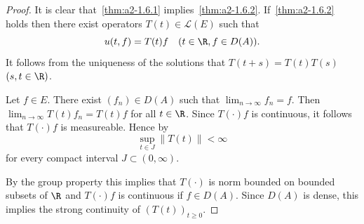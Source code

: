 \begin{proof}
It is clear that~\ref{thm:a2-1.6.1} implies~\ref{thm:a2-1.6.2}. 
If~\ref{thm:a2-1.6.2}   holds then there exist operators $T(t) \in \mathcal{L}(E)$ such that 
%
\[
	u(t,f) = T(t)f \quad (t \in \R, f \in D(A)) .
\]
%
It follows from the uniqueness of the solutions that $T(t+s) = T(t)T(s)$ $(s,t \in \R)$.

Let $f \in E$. 
There exist $(f_{n}) \in D(A)$ such that $\lim_{n \to \infty} f_{n} = f$.
Then $\lim_{n \to \infty} T(t)f_{n} = T(t)f$ for all $t \in \R$.
Since $T(\cdot)f$ is continuous, it follows that $T(\cdot)f$ is measureable.
Hence by \textcite[10.2.1]{hillephillips:1957} 
%
\[
	\sup_{t \in J}\|T(t)\| < \infty
\]
%
for every compact interval $J \subset (0,\infty)$.

By the group property this implies that $T(\cdot)$ is norm bounded on bounded subsets of\/ $\R$ and
$T(\cdot)f$ is continuous if\/ $f \in D(A)$.
Since $D(A)$ is dense, this implies the strong continuity of\/ $(T(t))_{t \geq 0}$.
\end{proof}
